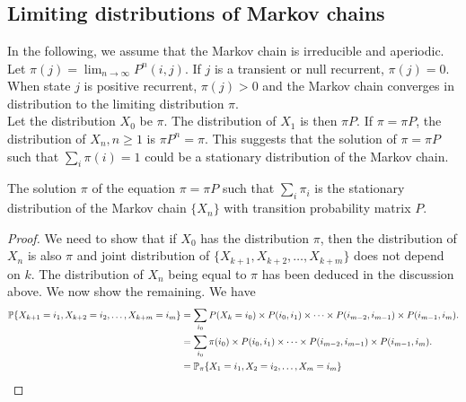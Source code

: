 \documentclass[all-lectures.tex]{subfiles}
\begin{document}

\setcounter{section}{2}
\setcounter{subsection}{0}

\section*{}
\subsection{Limiting distributions of Markov chains}
In the following, we assume that the Markov chain is irreducible and aperiodic. \\
\indent Let $\pi(j) = \lim_{n\rightarrow \infty} P^n(i,j)$. If $j$ is a transient or null recurrent, $\pi(j) = 0$. When state $j$ is positive recurrent, $\pi(j) > 0$ and the Markov chain converges in distribution to the limiting distribution $\pi$. \\
\indent Let the distribution $X_0$ be $\pi$. The distribution of $X_1$ is then $\pi P$. If $\pi = \pi P$, the distribution of $X_n, n \geq 1$ is $\pi P^n = \pi$. This suggests that the solution of $\pi = \pi P$ such that $\sum_i \pi(i) = 1$ could be a stationary distribution of the Markov chain.
\begin{prop}
The solution $\pi$ of the equation $\pi = \pi P$ such that $\sum_i \pi_i$ is the stationary distribution of the Markov chain $\{X_n\}$ with transition probability matrix $P$.
\begin{proof}
We need to show that if $X_0$ has the distribution $\pi$, then the distribution of $X_n$ is also $\pi$ and joint distribution of $\{X_{k+1},X_{k+2},\dots,X_{k+m}\}$ does not depend on $k$. The distribution of $X_n$ being equal to $\pi$ has been deduced in the discussion above. We now show the remaining. We have 
\begin{align*}
\P\{X_{k+1} = i_1,X_{k+2} = i_2,\dots,X_{k+m} = i_m\} &= \sum_{i_0} P(X_{k} = i_0) \times P(i_{0},i_{1}) \times \dots \times P(i_{m-2},i_{m-1}) \times P(i_{m-1},i_{m}) . \\
&= \sum_{i_0} \pi(i_0) \times P(i_{0},i_{1}) \times \dots  \times P(i_{m-2},i_{m-1}) \times P(i_{m-1},i_{m}). \\
&= \P_{\pi}\{X_{1} = i_1,X_{2} = i_2,\dots,X_{m} = i_m\} 
\end{align*}
\end{proof}
\end{prop}
\end{document}
